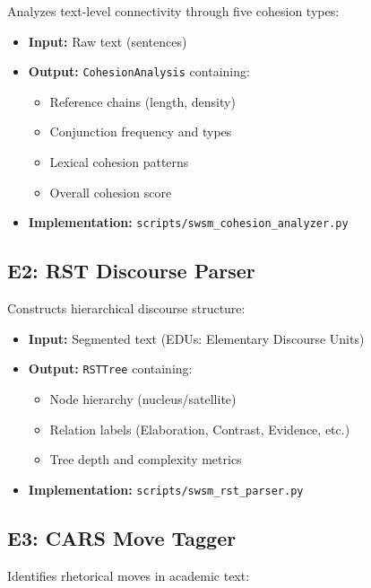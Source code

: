 Analyzes text-level connectivity through five cohesion types:

\begin{itemize}
    \item \textbf{Input:} Raw text (sentences)
    \item \textbf{Output:} \texttt{CohesionAnalysis} containing:
    \begin{itemize}
        \item Reference chains (length, density)
        \item Conjunction frequency and types
        \item Lexical cohesion patterns
        \item Overall cohesion score
    \end{itemize}
    \item \textbf{Implementation:} \texttt{scripts/swsm\_cohesion\_analyzer.py}
\end{itemize}

\subsection{E2: RST Discourse Parser}
\label{sec:sw-e2}

Constructs hierarchical discourse structure:

\begin{itemize}
    \item \textbf{Input:} Segmented text (EDUs: Elementary Discourse Units)
    \item \textbf{Output:} \texttt{RSTTree} containing:
    \begin{itemize}
        \item Node hierarchy (nucleus/satellite)
        \item Relation labels (Elaboration, Contrast, Evidence, etc.)
        \item Tree depth and complexity metrics
    \end{itemize}
    \item \textbf{Implementation:} \texttt{scripts/swsm\_rst\_parser.py}
\end{itemize}

\subsection{E3: CARS Move Tagger}
\label{sec:sw-e3}

Identifies rhetorical moves in academic text:

